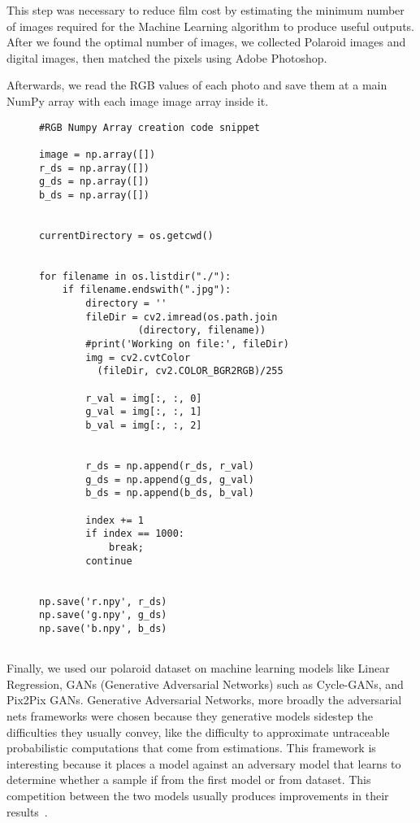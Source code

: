 \documentclass[conference]{IEEEtran}
\begin{document}
This step was necessary to reduce film cost by estimating the minimum number of images required for the Machine Learning algorithm to produce useful outputs. After we found the optimal number of images, we collected Polaroid images and digital images, then matched the pixels using Adobe Photoshop.

Afterwards, we read the RGB values of each photo and save them at a main NumPy array with each image image array inside it.


\begin{figure}[htb!]
\begin{verbatim}
#RGB Numpy Array creation code snippet

image = np.array([])
r_ds = np.array([])
g_ds = np.array([])
b_ds = np.array([])


currentDirectory = os.getcwd()


for filename in os.listdir("./"):
    if filename.endswith(".jpg"): 
        directory = ''
        fileDir = cv2.imread(os.path.join
        	     (directory, filename))
        #print('Working on file:', fileDir)
        img = cv2.cvtColor
          (fileDir, cv2.COLOR_BGR2RGB)/255
	
        r_val = img[:, :, 0]
        g_val = img[:, :, 1]
        b_val = img[:, :, 2]

        
        r_ds = np.append(r_ds, r_val)
        g_ds = np.append(g_ds, g_val)
        b_ds = np.append(b_ds, b_val)
        
        index += 1
        if index == 1000:
            break;
        continue


np.save('r.npy', r_ds)
np.save('g.npy', g_ds)
np.save('b.npy', b_ds)


\end{verbatim}
\end{figure}


Finally, we used our polaroid dataset on machine learning models like Linear Regression, GANs (Generative Adversarial Networks) such as Cycle-GANs, and Pix2Pix GANs.
Generative Adversarial Networks, more broadly the adversarial nets frameworks were chosen because they generative models sidestep the difficulties they usually convey, like the difficulty to approximate untraceable probabilistic computations that come from estimations. This framework is interesting because it places a model against an adversary model that learns to determine whether a sample if from the first model or from dataset. This competition between the two models usually produces improvements in their results~\cite{NIPS2014_5423}.
\end{document}
